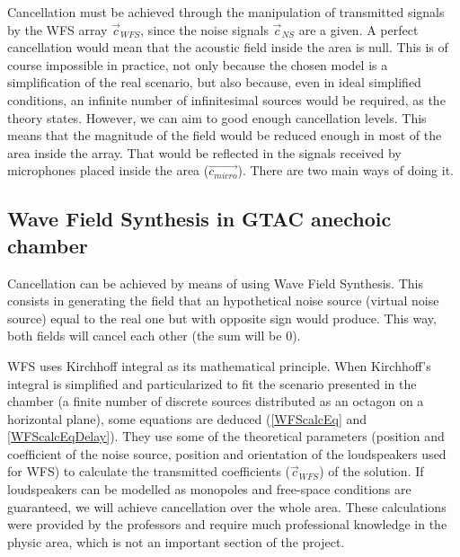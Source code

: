 Cancellation must be achieved through the manipulation of transmitted signals by the WFS array $\vec{c}_\mathit{WFS}$, since the noise signals $\vec{c}_{\mathit{NS}}$ are a given. A perfect cancellation would mean that the acoustic field inside the area is null. This is of course impossible in practice, not only because the chosen model is a simplification of the real scenario, but also because, even in ideal simplified conditions, an infinite number of infinitesimal sources would be required, as the theory states. However, we can aim to good enough cancellation levels. This means that the magnitude of the field would be reduced enough in most of the area inside the array. That would be reflected in the signals received by microphones placed inside the area ($\vec{c_\mathit{micro}}$). There are two main ways of doing it.

\subsection{Wave Field Synthesis in GTAC anechoic chamber} \label{WFSexplanation}
Cancellation can be achieved by means of using Wave Field Synthesis. This consists in generating the field that an hypothetical noise source (virtual noise source) equal to the real one but with opposite sign would produce. This way, both fields will cancel each other (the sum will be $0$).

WFS uses Kirchhoff integral as its mathematical principle. When Kirchhoff's integral is simplified and particularized to fit the scenario presented in the chamber (a finite number of discrete sources distributed as an octagon on a horizontal plane), some equations are deduced (\autoref{WFScalcEq} and \autoref{WFScalcEqDelay}). They use some of the theoretical parameters (position and coefficient of the noise source, position and orientation of the loudspeakers used for WFS) to calculate the transmitted coefficients ($\vec{c}_\mathit{WFS}$) of the solution. If loudspeakers can be modelled as monopoles and free-space conditions are guaranteed, we will achieve cancellation over the whole area. These calculations were provided by the professors and require much professional knowledge in the physic area, which is not an important section of the project.

